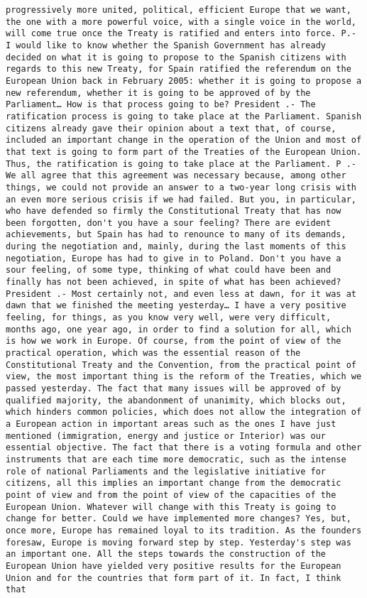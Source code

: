\documentclass[
]{article}
\begin{document}
\begin{verbatim}
progressively more united, political, efficient Europe that we want, the one with a more powerful voice, with a single voice in the world, will come true once the Treaty is ratified and enters into force. P.- I would like to know whether the Spanish Government has already decided on what it is going to propose to the Spanish citizens with regards to this new Treaty, for Spain ratified the referendum on the European Union back in February 2005: whether it is going to propose a new referendum, whether it is going to be approved of by the Parliament… How is that process going to be? President .- The ratification process is going to take place at the Parliament. Spanish citizens already gave their opinion about a text that, of course, included an important change in the operation of the Union and most of that text is going to form part of the Treaties of the European Union. Thus, the ratification is going to take place at the Parliament. P .- We all agree that this agreement was necessary because, among other things, we could not provide an answer to a two-year long crisis with an even more serious crisis if we had failed. But you, in particular, who have defended so firmly the Constitutional Treaty that has now been forgotten, don't you have a sour feeling? There are evident achievements, but Spain has had to renounce to many of its demands, during the negotiation and, mainly, during the last moments of this negotiation, Europe has had to give in to Poland. Don't you have a sour feeling, of some type, thinking of what could have been and finally has not been achieved, in spite of what has been achieved? President .- Most certainly not, and even less at dawn, for it was at dawn that we finished the meeting yesterday… I have a very positive feeling, for things, as you know very well, were very difficult, months ago, one year ago, in order to find a solution for all, which is how we work in Europe. Of course, from the point of view of the practical operation, which was the essential reason of the Constitutional Treaty and the Convention, from the practical point of view, the most important thing is the reform of the Treaties, which we passed yesterday. The fact that many issues will be approved of by qualified majority, the abandonment of unanimity, which blocks out, which hinders common policies, which does not allow the integration of a European action in important areas such as the ones I have just mentioned (immigration, energy and justice or Interior) was our essential objective. The fact that there is a voting formula and other instruments that are each time more democratic, such as the intense role of national Parliaments and the legislative initiative for citizens, all this implies an important change from the democratic point of view and from the point of view of the capacities of the European Union. Whatever will change with this Treaty is going to change for better. Could we have implemented more changes? Yes, but, once more, Europe has remained loyal to its tradition. As the founders foresaw, Europe is moving forward step by step. Yesterday's step was an important one. All the steps towards the construction of the European Union have yielded very positive results for the European Union and for the countries that form part of it. In fact, I think that 
\end{verbatim}
\end{document}
